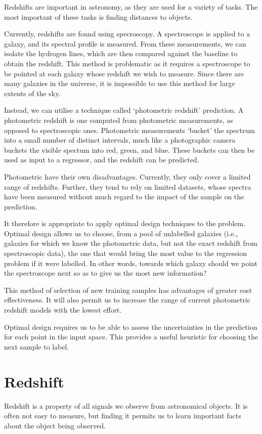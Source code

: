 \documentclass[11pt,twoside,openright]{report}
\begin{document}
Redshifts are important in astronomy, as they are used for a variety of tasks. The most important of these tasks is finding distances to objects.

Currently, redshifts are found using specroscopy. A spectroscope is applied to a galaxy, and its spectral profile is measured. From these measurements, we can isolate the hydrogen lines, which are then compared against the baseline to obtain the redshift. This method is problematic as it requires a spectroscope to be pointed at each galaxy whose redshift we wish to measure. Since there are many galaxies in the universe, it is impossible to use this method for large extents of the sky.

Instead, we can utilise a technique called `photometric redshift' prediction. A photometric redshift is one computed from photometric measurements, as opposed to spectroscopic ones. Photometric measurements `bucket' the spectrum into a small number of distinct intervals, much like a photographic camera buckets the visible spectum into red, green, and blue. These buckets can then be used as input to a regressor, and the redshift can be predicted.

Photometric have their own disadvantages. Currently, they only cover a limited range of redshifts. Further, they tend to rely on limited datasets, whose spectra have been measured without much regard to the impact of the sample on the prediction.

It therefore is appropriate to apply optimal design techniques to the problem. Optimal design allows us to choose, from a pool of unlabelled galaxies (i.e., galaxies for which we know the photometric data, but not the exact redshift from spectroscopic data), the one that would bring the most value to the regression problem if it were labelled. In other words, towards which galaxy should we point the spectroscope next so as to give us the most new information?

This method of selection of new training samples has advantages of greater cost effectiveness. It will also permit us to increase the range of current photometric redshift models with the lowest effort.

Optimal design requires us to be able to assess the uncertainties in the prediction for each point in the input space. This provides a useful heuristic for choosing the next sample to label.

\section{Redshift}
  Redshift is a property of all signals we observe from astronomical objects. It is often not easy to measure, but finding it permits us to learn important facts about the object being observed.
\end{document}
